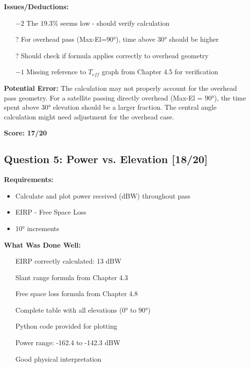 \documentclass[11pt,letterpaper]{article}
\begin{document}
\textbf{Issues/Deductions:}
\begin{itemize}
    \item[\color{red}$-2$] The 19.3\% seems low - should verify calculation
    \item[\color{orange}?] For overhead pass (Max-El=90°), time above 30° should be higher
    \item[\color{orange}?] Should check if formula applies correctly to overhead geometry
    \item[\color{red}$-1$] Missing reference to $T_{eff}$ graph from Chapter 4.5 for verification
\end{itemize}

\textbf{Potential Error:}
The calculation may not properly account for the overhead pass geometry. For a satellite passing directly overhead (Max-El = 90°), the time spent above 30° elevation should be a larger fraction. The central angle calculation might need adjustment for the overhead case.

\textbf{Score: 17/20}

\subsection{Question 5: Power vs. Elevation [18/20]}

\textbf{Requirements:}
\begin{itemize}
    \item Calculate and plot power received (dBW) throughout pass
    \item EIRP - Free Space Loss
    \item 10° increments
\end{itemize}

\textbf{What Was Done Well:}
\begin{itemize}
    \item[\color{green}\checkmark] EIRP correctly calculated: 13 dBW
    \item[\color{green}\checkmark] Slant range formula from Chapter 4.3
    \item[\color{green}\checkmark] Free space loss formula from Chapter 4.8
    \item[\color{green}\checkmark] Complete table with all elevations (0° to 90°)
    \item[\color{green}\checkmark] Python code provided for plotting
    \item[\color{green}\checkmark] Power range: -162.4 to -142.3 dBW
    \item[\color{green}\checkmark] Good physical interpretation
\end{itemize}
\end{document}
